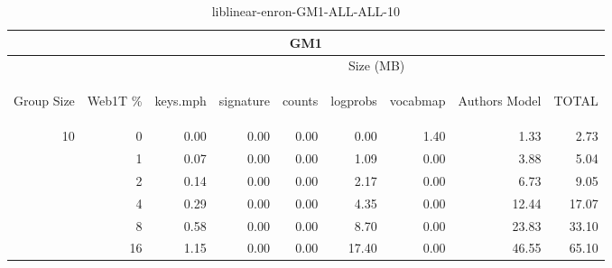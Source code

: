 \begin{center}
\begin{table}[htbp] 
 \begin{center}
\begin{tabular}{ | r | r | r | r | r | r | r | r | r |}
\hline
\multicolumn{9}{|c|}{GM1}\\
\hline
 & & \multicolumn{7}{|c|}{Size (MB)}\\ \cline{3-9}
\begin{sideways}Group Size\end{sideways} & \begin{sideways}Web1T \% \end{sideways} & \begin{sideways}keys.mph\end{sideways} & \begin{sideways}signature\end{sideways} & \begin{sideways}counts\end{sideways} & \begin{sideways}logprobs\end{sideways} & \begin{sideways}vocabmap\end{sideways} & \begin{sideways}Authors Model \end{sideways} & \begin{sideways}TOTAL\end{sideways}\\
\hline
\multirow{5}{*}{10}
 & 0 & 0.00 & 0.00 & 0.00 & 0.00 & 1.40 & 1.33 & 2.73\\ \cline{2-9}
 & 1 & 0.07 & 0.00 & 0.00 & 1.09 & 0.00 & 3.88 & 5.04\\ \cline{2-9}
 & 2 & 0.14 & 0.00 & 0.00 & 2.17 & 0.00 & 6.73 & 9.05\\ \cline{2-9}
 & 4 & 0.29 & 0.00 & 0.00 & 4.35 & 0.00 & 12.44 & 17.07\\ \cline{2-9}
 & 8 & 0.58 & 0.00 & 0.00 & 8.70 & 0.00 & 23.83 & 33.10\\ \cline{2-9}
 & 16 & 1.15 & 0.00 & 0.00 & 17.40 & 0.00 & 46.55 & 65.10\\ \cline{2-9}
\hline
\end{tabular}
\caption{liblinear-enron-GM1-ALL-ALL-10}
\label{table:liblinear-enron-GM1-ALL-ALL-10}
\end{center}
 \end{table}
\end{center}

